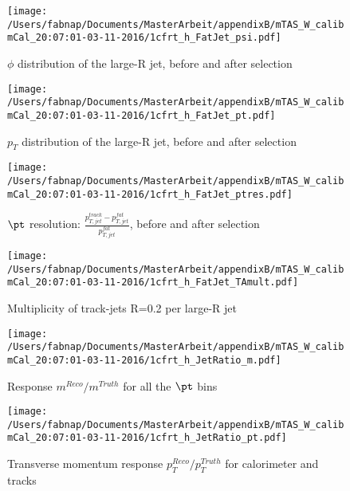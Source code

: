\begin{figure}
 
\texttt{[image: /Users/fabnap/Documents/MasterArbeit/appendixB/mTAS\_W\_calibmCal\_20:07:01-03-11-2016/1cfrt\_h\_FatJet\_psi.pdf]}
\caption{$\phi$ distribution of the large-R jet, before and after selection}
 
\end{figure}
 
\begin{figure}
 
\texttt{[image: /Users/fabnap/Documents/MasterArbeit/appendixB/mTAS\_W\_calibmCal\_20:07:01-03-11-2016/1cfrt\_h\_FatJet\_pt.pdf]}
\caption{$p_{T}$ distribution of the large-R jet, before and after selection}
 
\end{figure}
 
\begin{figure}
 
\texttt{[image: /Users/fabnap/Documents/MasterArbeit/appendixB/mTAS\_W\_calibmCal\_20:07:01-03-11-2016/1cfrt\_h\_FatJet\_ptres.pdf]}
\caption{$\pt$ resolution: $\frac{p_{T,jet}^{track}-p_{T,jet}^{fat}}{p_{T,jet}^{fat}}$, before and after selection }
 
\end{figure}
 
\begin{figure}
 
\texttt{[image: /Users/fabnap/Documents/MasterArbeit/appendixB/mTAS\_W\_calibmCal\_20:07:01-03-11-2016/1cfrt\_h\_FatJet\_TAmult.pdf]}
\caption{Multiplicity of track-jets R=0.2 per large-R jet}
 
\end{figure}
\begin{figure}
 
\texttt{[image: /Users/fabnap/Documents/MasterArbeit/appendixB/mTAS\_W\_calibmCal\_20:07:01-03-11-2016/1cfrt\_h\_JetRatio\_m.pdf]}
\caption{Response $m^{Reco} / m^{Truth}$ for all the $\pt$ bins}
 
\end{figure}
 
\begin{figure}
 
\texttt{[image: /Users/fabnap/Documents/MasterArbeit/appendixB/mTAS\_W\_calibmCal\_20:07:01-03-11-2016/1cfrt\_h\_JetRatio\_pt.pdf]}
\caption{Transverse momentum response $p_{T}^{Reco} / p_{T}^{Truth}$ for calorimeter and tracks}
 
\end{figure}
 
